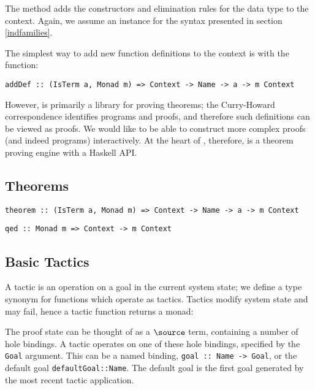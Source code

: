 The  method adds the constructors and elimination
rules for the data type to the context. Again, we assume an instance
for the syntax presented in section \ref{indfamilies}.

The simplest way to add new function definitions to the context is
with the  function:

\begin{verbatim}
addDef :: (IsTerm a, Monad m) => Context -> Name -> a -> m Context
\end{verbatim}

However, \Ivor{} is primarily a library for proving theorems; the
Curry-Howard correspondence identifies programs and proofs, and
therefore such definitions can be viewed as proofs. We would like to
be able to construct more complex proofs (and indeed programs)
interactively. At the heart of \Ivor{}, therefore, is a theorem
proving engine with a Haskell API.

\subsection{Theorems}

\begin{verbatim}
theorem :: (IsTerm a, Monad m) => Context -> Name -> a -> m Context
\end{verbatim}

\begin{verbatim}
qed :: Monad m => Context -> m Context
\end{verbatim}

\subsection{Basic Tactics}

A tactic is an operation on a goal in the current system state; we
define a type synonym  for functions which operate as
tactics. Tactics modify system state and may fail, hence a tactic
function returns a monad:


The proof state can be thought of as a $\source$ term, containing a
number of hole bindings. A tactic operates on one of these hole
bindings, specified by the \texttt{Goal} argument. This can be a named
binding, \texttt{goal :: Name -> Goal}, or the default goal
\texttt{defaultGoal::Name}. The default goal is the first goal
generated by the most recent tactic application.

